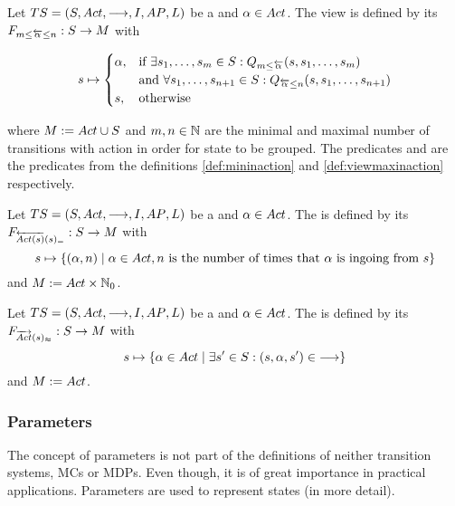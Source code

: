 \documentclass[preview]{standalone}
\begin{document}
\begin{definition}
	Let $\ts = \transitionsystem$ be a \chosengraphtypeN and $\action \in \actions$. The view 
	\viewspaninaction is defined by its \grpfctN $\gfctspaninaction : \states \to \arbset$ with
	
	\[
	\state \mapsto
	\begin{cases}
		\action,				& \text{if } \exists \state_1, \dots, \state_\numinactb \in \states: \predmininact[\numinactb] \\ &\text{and } \forall \state_1, \dots, \state_{\numinact+1} \in \states: \predmaxinact \\
		\state,          	& \text{otherwise}
	\end{cases}
	\]
	
	where $\imggrp := \actions \cup \states$ and $\numinactb, \numinact \in \natnums$ are the minimal and maximal number of transitions with action \action in order for state to be grouped. The predicates \predmininact and \predmaxinact are the predicates from the definitions \ref{def:mininaction} and \ref{def:viewmaxinaction} respectively.
\end{definition}

\begin{definition}
	Let $\ts = \transitionsystem$ be a \chosengraphtypeN and $\action \in \actions$. The \viewN \viewstronginactident is defined by its \grpfctN $\gfctstronginactident : \states \to \imggrp$ with
	\[
	\state \mapsto	
	\{(\action, \numinact) \mid \action \in \actions, \numinact \text{ is the number of times that \action is ingoing from } \state\}
	\]
	and $\imggrp := \actions \times \natnums_0$.
\end{definition}

\begin{definition}
	Let $\ts = \transitionsystem$ be a \chosengraphtypeN and $\action \in \actions$. The \viewN \viewweakoutactident is defined by its \grpfctN $\gfctweakoutactident : \states \to \imggrp$ with
	\[
	\state \mapsto \{\action \in \actions \mid \exists \state' \in \states : (\state, \action, \state') \in \transitionrel\} 	
	\]
	and $\imggrp := \actions$.
\end{definition}

\subsubsection{Parameters}
The concept of parameters is not part of the definitions of neither transition systems, MCs or MDPs. Even though, it is of great importance in practical applications. Parameters are used to represent states (in more detail). 
\end{document}
